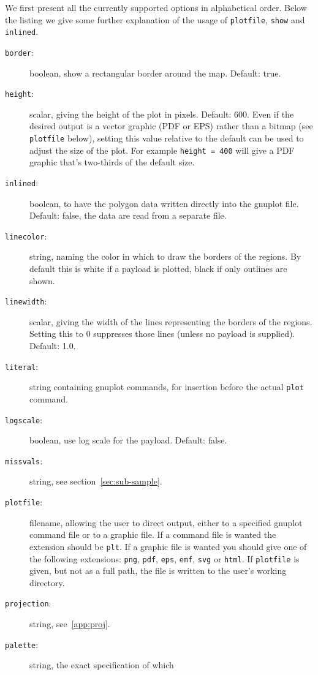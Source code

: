 \documentclass{article}
\begin{document}
We first present all the currently supported options in alphabetical
order. Below the listing we give some further explanation of the usage
of \texttt{plotfile}, \texttt{show} and \texttt{inlined}.

\begin{description}
\item[\texttt{border}:] boolean, show a rectangular border around the
  map. Default: true.
\item[\texttt{height}:] scalar, giving the height of the plot in
  pixels. Default: 600. Even if the desired output is a vector graphic
  (PDF or EPS) rather than a bitmap (see \texttt{plotfile} below),
  setting this value relative to the default can be used to adjust the
  size of the plot. For example \texttt{height = 400} will give a PDF
  graphic that's two-thirds of the default size.
\item[\texttt{inlined}:] boolean, to have the polygon data written
  directly into the \textsf{gnuplot} file. Default: false, the data
  are read from a separate file.
\item[\texttt{linecolor}:] string, naming the color in which to draw
  the borders of the regions. By default this is white if a payload is
  plotted, black if only outlines are shown.
\item[\texttt{linewidth}:] scalar, giving the width of the lines
  representing the borders of the regions. Setting this to 0
  suppresses those lines (unless no payload is supplied). Default:
  1.0.
\item[\texttt{literal}:] string containing \textsf{gnuplot} commands,
  for insertion before the actual \texttt{plot} command.
\item[\texttt{logscale}:] boolean, use log scale for the
  payload. Default: false.
\item[\texttt{missvals}:] string, see section~\ref{sec:sub-sample}.
\item[\texttt{plotfile}:] filename, allowing the user to direct
  output, either to a specified \textsf{gnuplot} command file or to a
  graphic file. If a command file is wanted the extension should be
  \texttt{plt}. If a graphic file is wanted you should give one of the
  following extensions: \texttt{png}, \texttt{pdf}, \texttt{eps},
  \texttt{emf}, \texttt{svg} or \texttt{html}.  If \texttt{plotfile}
  is given, but not as a full path, the file is written to the user's
  working directory.
\item[\texttt{projection}:] string, see~\ref{app:proj}.
\item[\texttt{palette}:] string, the exact specification of which

\end{description}
\end{document}
